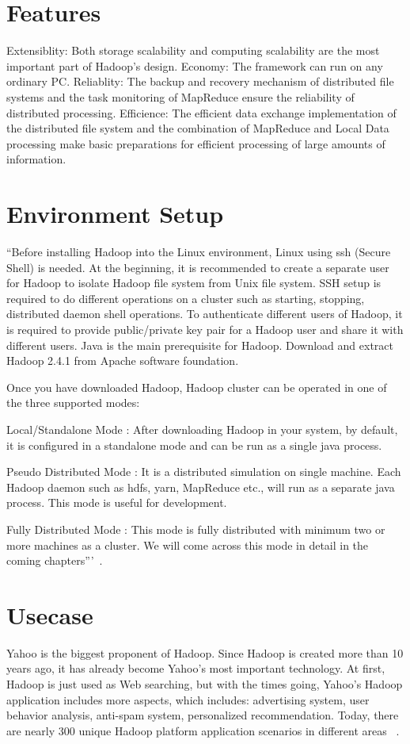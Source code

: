 \section{Features}
Extensiblity: Both storage scalability and computing scalability are the most important part of Hadoop's design.
Economy: The framework can run on any ordinary PC.
Reliablity: The backup and recovery mechanism of distributed file systems and the task monitoring of MapReduce ensure the reliability of distributed processing.
Efficience: The efficient data exchange implementation of the distributed file system and the combination of MapReduce and Local Data processing make basic preparations for efficient processing of large amounts of information.


\section{Environment Setup}
``Before installing Hadoop into the Linux environment,  Linux using ssh (Secure Shell) is needed. At the beginning, it is recommended to create a separate user for Hadoop to isolate Hadoop file system from Unix file system. SSH setup is required to do different operations on a cluster such as starting, stopping, distributed daemon shell operations. To authenticate different users of Hadoop, it is required to provide public/private key pair for a Hadoop user and share it with different users. Java is the main prerequisite for Hadoop. Download and extract Hadoop 2.4.1 from Apache software foundation. 

Once you have downloaded Hadoop, Hadoop cluster can be operated in one of the three supported modes:

Local/Standalone Mode : After downloading Hadoop in your system, by default, it is configured in a standalone mode and can be run as a single java process.

Pseudo Distributed Mode : It is a distributed simulation on single machine. Each Hadoop daemon such as hdfs, yarn, MapReduce etc., will run as a separate java process. This mode is useful for development.

Fully Distributed Mode : This mode is fully distributed with minimum two or more machines as a cluster. We will come across this mode in detail in the coming chapters'''~\cite{hid-sp18-508-hadoop}. 


\section{Usecase}
Yahoo is the biggest proponent of Hadoop. Since Hadoop is created more than 10 years ago, it has already become Yahoo's most important technology. At first, Hadoop is just used as Web searching, but with the times going, Yahoo's Hadoop application includes more aspects, which includes: advertising system, user behavior analysis, anti-spam system, personalized recommendation. Today, there are nearly 300 unique Hadoop platform application scenarios in different areas ~\cite{hid-sp18-508-yahoo}.

